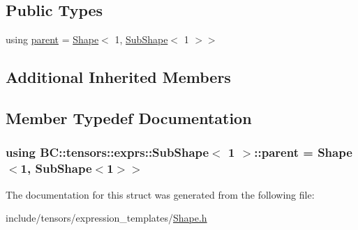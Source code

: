\subsection*{Public Types}
\begin{DoxyCompactItemize}
\item 
using \hyperlink{structBC_1_1tensors_1_1exprs_1_1SubShape_3_011_01_4_adb37523a23c1f7cdb01912911bf1b9bb}{parent} = \hyperlink{classBC_1_1tensors_1_1exprs_1_1Shape}{Shape}$<$ 1, \hyperlink{classBC_1_1tensors_1_1exprs_1_1SubShape}{Sub\+Shape}$<$ 1 $>$$>$
\end{DoxyCompactItemize}
\subsection*{Additional Inherited Members}


\subsection{Member Typedef Documentation}
\subsubsection[{\texorpdfstring{parent}{parent}}]{\setlength{\rightskip}{0pt plus 5cm}using {\bf B\+C\+::tensors\+::exprs\+::\+Sub\+Shape}$<$ 1 $>$\+::{\bf parent} =  {\bf Shape}$<$1, {\bf Sub\+Shape}$<$1$>$$>$}\hypertarget{structBC_1_1tensors_1_1exprs_1_1SubShape_3_011_01_4_adb37523a23c1f7cdb01912911bf1b9bb}{}\label{structBC_1_1tensors_1_1exprs_1_1SubShape_3_011_01_4_adb37523a23c1f7cdb01912911bf1b9bb}


The documentation for this struct was generated from the following file\+:\begin{DoxyCompactItemize}
\item 
include/tensors/expression\+\_\+templates/\hyperlink{Shape_8h}{Shape.\+h}\end{DoxyCompactItemize}
